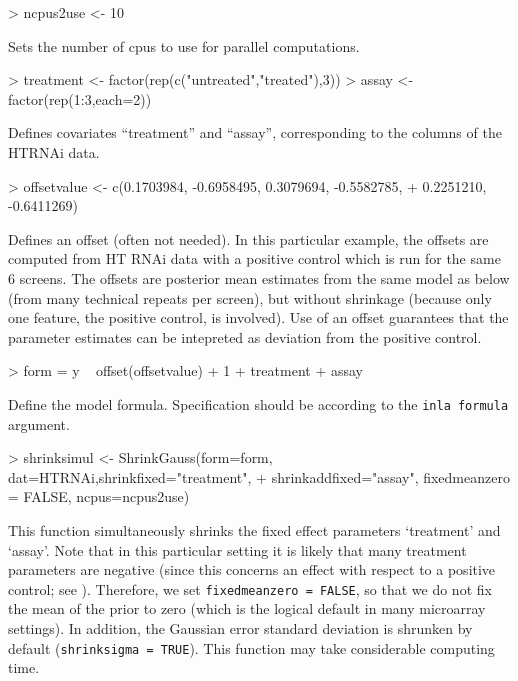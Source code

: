 \documentclass[11pt]{article}
\newcommand{\para}{\bigskip\noindent}
\begin{document}
\para
\begin{Schunk}
\begin{Sinput}
> ncpus2use <- 10
\end{Sinput}
\end{Schunk}
Sets the number of cpus to use for parallel computations.

\para
\begin{Schunk}
\begin{Sinput}
> treatment <- factor(rep(c("untreated","treated"),3))
> assay <- factor(rep(1:3,each=2))
\end{Sinput}
\end{Schunk}
Defines covariates ``treatment'' and ``assay'', corresponding to the columns of the HTRNAi data.

\para
\begin{Schunk}
\begin{Sinput}
> offsetvalue <- c(0.1703984, -0.6958495,  0.3079694, -0.5582785,
+ 0.2251210, -0.6411269)
\end{Sinput}
\end{Schunk}
Defines an offset (often not needed). In this particular example, the offsets are computed from
HT RNAi data with a positive control which is run for the same 6 screens. The offsets are posterior mean estimates from the same model
as below (from many technical repeats per screen), but without shrinkage (because only one feature, the positive control, is involved). Use of an offset
guarantees that the parameter estimates can be intepreted as deviation from the positive control.


\para
\begin{Schunk}
\begin{Sinput}
> form = y ~ offset(offsetvalue) + 1 + treatment + assay
\end{Sinput}
\end{Schunk}
Define the model formula. Specification should be according to the {\tt inla formula} argument.

\para
\begin{Schunk}
\begin{Sinput}
> shrinksimul <- ShrinkGauss(form=form, dat=HTRNAi,shrinkfixed="treatment",
+ shrinkaddfixed="assay", fixedmeanzero = FALSE, ncpus=ncpus2use)
\end{Sinput}
\end{Schunk}

This function simultaneously shrinks the fixed effect parameters `treatment' and `assay'.
Note that in this particular setting it is likely that many treatment parameters are negative (since this concerns an effect with
respect to a positive control; see \citep{WielHTRNAi}). Therefore, we set {\tt fixedmeanzero = FALSE}, so that we do not fix the mean
of the prior
to zero (which is the logical default in many microarray settings).
In addition, the Gaussian error standard deviation is shrunken by default ({\tt shrinksigma = TRUE}).
This function may take considerable computing time.
\end{document}
